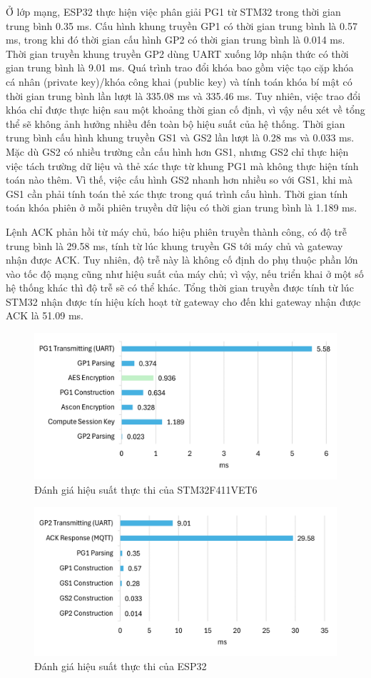 Ở lớp mạng, ESP32 thực hiện việc phân giải PG1 từ STM32 trong thời gian trung bình 0.35 ms. Cấu hình khung truyền GP1 có thời gian trung bình là 0.57 ms, trong khi đó thời gian cấu hình GP2 có thời gian trung bình là 0.014 ms. Thời gian truyền khung truyền GP2 dùng UART xuống lớp nhận thức có thời gian trung bình là 9.01 ms. Quá trình trao đổi khóa bao gồm việc tạo cặp khóa cá nhân (private key)/khóa công khai (public key) và tính toán khóa bí mật có thời gian trung bình lần lượt là 335.08 ms và 335.46 ms. Tuy nhiên, việc trao đổi khóa chỉ được thực hiện sau một khoảng thời gian cố định, vì vậy nếu xét về tổng thể sẽ không ảnh hưởng nhiều đến toàn bộ hiệu suất của hệ thống. Thời gian trung bình cấu hình khung truyền GS1 và GS2 lần lượt là 0.28 ms và 0.033 ms. Mặc dù GS2 có nhiều trường cần cấu hình hơn GS1, nhưng GS2 chỉ thực hiện việc tách trường dữ liệu và thẻ xác thực từ khung PG1 mà không thực hiện tính toán nào thêm. Vì thế, việc cấu hình GS2 nhanh hơn nhiều so với GS1, khi mà GS1 cần phải tính toán thẻ xác thực trong quá trình cấu hình. Thời gian tính toán khóa phiên ở mỗi phiên truyền dữ liệu có thời gian trung bình là 1.189 ms.

Lệnh ACK phản hồi từ máy chủ, báo hiệu phiên truyền thành công, có độ trễ trung bình là 29.58 ms, tính từ lúc khung truyền GS tới máy chủ và gateway nhận được ACK. Tuy nhiên, độ trễ này là không cố định do phụ thuộc phần lớn vào tốc độ mạng cũng như hiệu suất của máy chủ; vì vậy, nếu triển khai ở một số hệ thống khác thì độ trễ sẽ có thể khác. Tổng thời gian truyền được tính từ lúc STM32 nhận được tín hiệu kích hoạt từ gateway cho đến khi gateway nhận được ACK là 51.09 ms.

\begin{figure}[H]
    \centering
    \includegraphics[width=0.75\linewidth]{stm32-2.png}
    \caption{Đánh giá hiệu suất thực thi của STM32F411VET6}
    \label{fig:stm32}
\end{figure}

\begin{figure}[H]
    \centering
    \includegraphics[width=0.75\linewidth]{esp32.png}
    \caption{Đánh giá hiệu suất thực thi của ESP32}
    \label{fig:esp32}
\end{figure}

